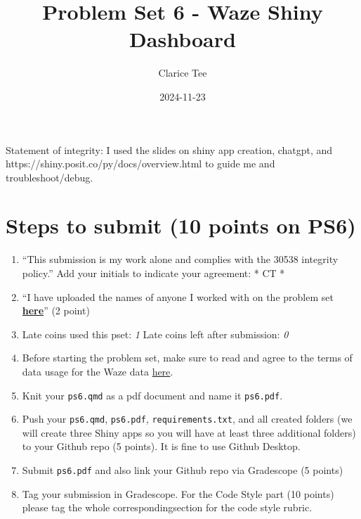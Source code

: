 \documentclass[
  letterpaper,
  DIV=11,
  numbers=noendperiod]{scrartcl}
\title{Problem Set 6 - Waze Shiny Dashboard}
\author{Clarice Tee}
\date{2024-11-23}
\begin{document}
\maketitle



Statement of integrity: I used the slides on shiny app creation,
chatgpt, and https://shiny.posit.co/py/docs/overview.html to guide me
and troubleshoot/debug.

\section*{Steps to submit (10 points on
PS6)}\label{steps-to-submit-10-points-on-ps6}

\begin{enumerate}
\def\labelenumi{\arabic{enumi}.}
\item
  ``This submission is my work alone and complies with the 30538
  integrity policy.'' Add your initials to indicate your agreement: * CT
  *
\item
  ``I have uploaded the names of anyone I worked with on the problem set
  \textbf{\href{https://docs.google.com/forms/d/185usrCREQaUbvAXpWhChkjghdGgmAZXA3lPWpXLLsts/edit}{here}}''
  (2 point)
\item
  Late coins used this pset: \emph{1} Late coins left after submission:
  \emph{0}
\item
  Before starting the problem set, make sure to read and agree to the
  terms of data usage for the Waze data
  \href{https://canvas.uchicago.edu/courses/59054/quizzes/130617}{here}.
\item
  Knit your \texttt{ps6.qmd} as a pdf document and name it
  \texttt{ps6.pdf}.
\item
  Push your \texttt{ps6.qmd}, \texttt{ps6.pdf},
  \texttt{requirements.txt}, and all created folders (we will create
  three Shiny apps so you will have at least three additional folders)
  to your Github repo (5 points). It is fine to use Github Desktop.
\item
  Submit \texttt{ps6.pdf} and also link your Github repo via Gradescope
  (5 points)
\item
  Tag your submission in Gradescope. For the Code Style part (10 points)
  please tag the whole correspondingsection for the code style rubric.
\end{enumerate}
\end{document}
